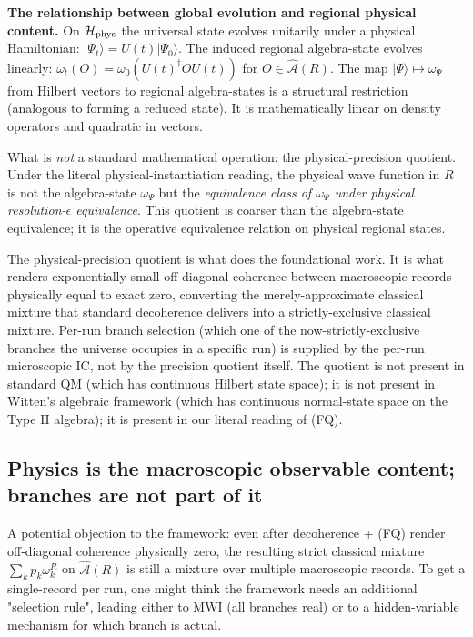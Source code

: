 \documentclass[11pt,a4paper]{article}
\begin{document}
\textbf{The relationship between global evolution and regional physical content.} On $\mathcal{H}_{\rm phys}$ the universal state evolves unitarily under a physical Hamiltonian: $|\Psi_t\rangle = U(t)|\Psi_0\rangle$. The induced regional algebra-state evolves linearly: $\omega_t(O) = \omega_0(U(t)^\dagger O U(t))$ for $O \in \hat{\mathcal{A}}(R)$. The map $|\Psi\rangle \mapsto \omega_\Psi$ from Hilbert vectors to regional algebra-states is a structural restriction (analogous to forming a reduced state). It is mathematically linear on density operators and quadratic in vectors.

What is \emph{not} a standard mathematical operation: the physical-precision quotient. Under the literal physical-instantiation reading, the physical wave function in $R$ is not the algebra-state $\omega_\Psi$ but the \emph{equivalence class of $\omega_\Psi$ under physical resolution-$\epsilon$ equivalence}. This quotient is coarser than the algebra-state equivalence; it is the operative equivalence relation on physical regional states.

The physical-precision quotient is what does the foundational work. It is what renders exponentially-small off-diagonal coherence between macroscopic records physically equal to exact zero, converting the merely-approximate classical mixture that standard decoherence delivers into a strictly-exclusive classical mixture. Per-run branch selection (which one of the now-strictly-exclusive branches the universe occupies in a specific run) is supplied by the per-run microscopic IC, not by the precision quotient itself. The quotient is not present in standard QM (which has continuous Hilbert state space); it is not present in Witten's algebraic framework (which has continuous normal-state space on the Type II algebra); it is present in our literal reading of (FQ).

\subsection{Physics is the macroscopic observable content; branches are not part of it}

A potential objection to the framework: even after decoherence + (FQ) render off-diagonal coherence physically zero, the resulting strict classical mixture $\sum_k p_k \omega_k^R$ on $\hat{\mathcal{A}}(R)$ is still a mixture over multiple macroscopic records. To get a single-record per run, one might think the framework needs an additional "selection rule", leading either to MWI (all branches real) or to a hidden-variable mechanism for which branch is actual.
\end{document}

